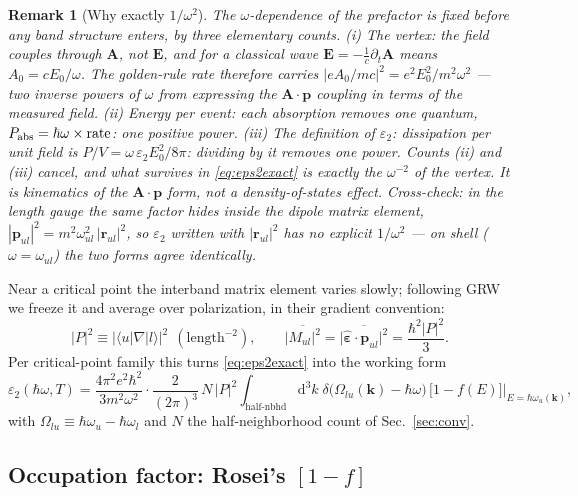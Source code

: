\documentclass[11pt,a4paper]{article}
\numberwithin{equation}{section}
\newcommand{\hw}{\hbar\omega}
\newcommand{\pul}{\mathbf{p}_{ul}}
\newcommand{\eps}{\varepsilon}
\newcommand{\dd}{\mathrm{d}}
\newcommand{\fFD}{f}
\newtheorem{remark}{Remark}[section]
\begin{document}
\begin{remark}[Why exactly $1/\omega^2$]\label{rem:w2}
The $\omega$-dependence of the prefactor is fixed before any band
structure enters, by three elementary counts.
(i) \emph{The vertex}: the field couples through $\mathbf A$, not
$\mathbf E$, and for a classical wave
$\mathbf E=-\tfrac1c\partial_t\mathbf A$ means $A_0=cE_0/\omega$.  The
golden-rule rate therefore carries
$|eA_0/mc|^2=e^2E_0^2/m^2\omega^2$ --- \emph{two} inverse powers of
$\omega$ from expressing the $\mathbf A\!\cdot\!\mathbf p$ coupling in
terms of the measured field.
(ii) \emph{Energy per event}: each absorption removes one quantum,
$P_{\rm abs}=\hw\times{\rm rate}$: one positive power.
(iii) \emph{The definition of $\eps_2$}: dissipation per unit field is
$P/V=\omega\,\eps_2E_0^2/8\pi$: dividing by it removes one power.
Counts (ii) and (iii) cancel, and what survives in
\eqref{eq:eps2exact} is exactly the $\omega^{-2}$ of the vertex.  It is
kinematics of the $\mathbf A\!\cdot\!\mathbf p$ form, not a
density-of-states effect.  Cross-check: in the length gauge the same
factor hides inside the dipole matrix element,
$|\pul|^2=m^2\omega_{ul}^2\,|\mathbf r_{ul}|^2$, so $\eps_2$ written
with $|\mathbf r_{ul}|^2$ has no explicit $1/\omega^2$ --- on shell
($\omega=\omega_{ul}$) the two forms agree identically.
\end{remark}

Near a critical point the interband matrix element varies slowly;
following GRW we freeze it and average over polarization, in their
gradient convention:
\begin{equation}
|P|^2\equiv\bigl|\langle u|\nabla|l\rangle\bigr|^2
\ \ (\text{length}^{-2}),
\qquad
\overline{|M_{ul}|^2}
=\overline{\bigl|\hat{\bm\eps}\!\cdot\!\pul\bigr|^2}
=\frac{\hbar^2|P|^2}{3} .
\label{eq:Pdef}
\end{equation}
Per critical-point family this turns \eqref{eq:eps2exact} into the
working form
\begin{equation}
\eps_2(\hw,T)=\frac{4\pi^2e^2\hbar^2}{3m^2\omega^2}\cdot
\frac{2}{(2\pi)^3}\,N\,|P|^2
\int_{\text{half-nbhd}}\!\!\dd^3k\;
\delta\bigl(\Omega_{lu}(\mathbf k)-\hw\bigr)\,
\bigl[1-\fFD(E)\bigr]\Bigr|_{E=\hbar\omega_u(\mathbf k)},
\label{eq:star}
\end{equation}
with $\Omega_{lu}\equiv\hbar\omega_u-\hbar\omega_l$ and $N$ the
half-neighborhood count of Sec.~\ref{sec:conv}.

\subsection{Occupation factor: Rosei's $[1-f]$}\label{sec:occupation}
\end{document}
